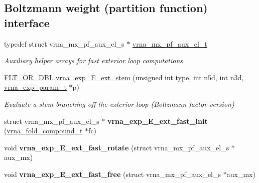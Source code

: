 \subsection*{Boltzmann weight (partition function) interface}
\begin{DoxyCompactItemize}
\item 
typedef struct vrna\+\_\+mx\+\_\+pf\+\_\+aux\+\_\+el\+\_\+s $\ast$ \mbox{\hyperlink{group__eval__loops__ext_gaf9d5160c11ffad3ec258124a77fee13c}{vrna\+\_\+mx\+\_\+pf\+\_\+aux\+\_\+el\+\_\+t}}
\begin{DoxyCompactList}\small\item\em Auxiliary helper arrays for fast exterior loop computations. \end{DoxyCompactList}\item 
\mbox{\hyperlink{group__data__structures_ga31125aeace516926bf7f251f759b6126}{F\+L\+T\+\_\+\+O\+R\+\_\+\+D\+BL}} \mbox{\hyperlink{group__eval__loops__ext_ga357484958d3cd677f88f16c75c8a5730}{vrna\+\_\+exp\+\_\+\+E\+\_\+ext\+\_\+stem}} (unsigned int type, int n5d, int n3d, \mbox{\hyperlink{group__energy__parameters_ga01d8b92fe734df8d79a6169482c7d8d8}{vrna\+\_\+exp\+\_\+param\+\_\+t}} $\ast$p)
\begin{DoxyCompactList}\small\item\em Evaluate a stem branching off the exterior loop (Boltzmann factor version) \end{DoxyCompactList}\item 
\mbox{\label{group__eval__loops__ext_ga2537300864b4498ab2bac23cc725719f}} 
struct vrna\+\_\+mx\+\_\+pf\+\_\+aux\+\_\+el\+\_\+s $\ast$ {\bfseries vrna\+\_\+exp\+\_\+\+E\+\_\+ext\+\_\+fast\+\_\+init} (\mbox{\hyperlink{group__fold__compound_ga1b0cef17fd40466cef5968eaeeff6166}{vrna\+\_\+fold\+\_\+compound\+\_\+t}} $\ast$fc)
\item 
\mbox{\label{group__eval__loops__ext_gabe4ed7e3d6152a3b9db4e4ed762aa1ba}} 
void {\bfseries vrna\+\_\+exp\+\_\+\+E\+\_\+ext\+\_\+fast\+\_\+rotate} (struct vrna\+\_\+mx\+\_\+pf\+\_\+aux\+\_\+el\+\_\+s $\ast$aux\+\_\+mx)
\item 
\mbox{\label{group__eval__loops__ext_ga4357b7937f1b840f063e44b859332f98}} 
void {\bfseries vrna\+\_\+exp\+\_\+\+E\+\_\+ext\+\_\+fast\+\_\+free} (struct vrna\+\_\+mx\+\_\+pf\+\_\+aux\+\_\+el\+\_\+s $\ast$aux\+\_\+mx)
\item 

\end{DoxyCompactItemize}
